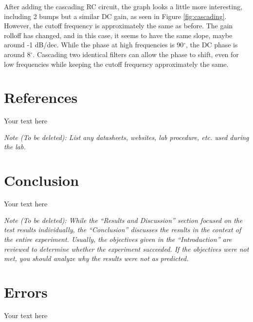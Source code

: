 \documentclass[10pt]{article}
\begin{document}
After adding the cascading RC circuit, the graph looks a little more interesting, including 2 bumps but a similar DC gain, as seen in Figure \ref{fig:cascading}. However, the cutoff frequency is approximately the same as before. The gain rolloff has changed, and in this case, it seems to have the same slope, maybe around -1 dB/dec. While the phase at high frequencies is 90$^\circ$, the DC phase is around 8$^\circ$. Cascading two identical filters can allow the phase to shift, even for low frequencies while keeping the cutoff frequency approximately the same.


\section{References}

Your text here

\medskip

\textit{Note (To be deleted): List any datasheets, websites, lab procedure, etc. used during the lab.}

\section{Conclusion}

Your text here

\medskip

\textit{Note (To be deleted): While the ``Results and Discussion'' section focused on the test results individually, the ``Conclusion'' discusses the results in the context of the entire experiment. Usually, the objectives given in the ``Introduction'' are reviewed to determine whether the experiment succeeded. If the objectives were not met, you should analyze why the results were not as predicted.}

\section{Errors}

Your text here

\medskip
\end{document}
